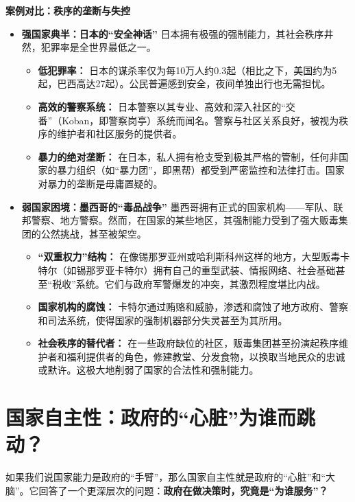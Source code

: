 \textbf{案例对比：秩序的垄断与失控}

\begin{itemize}
    \item \textbf{强国家典半：日本的“安全神话”}
    日本拥有极强的强制能力，其社会秩序井然，犯罪率是全世界最低之一。
    \begin{itemize}
        \item \textbf{低犯罪率：} 日本的谋杀率仅为每10万人约0.3起（相比之下，美国约为5起，巴西高达27起）。公民普遍感到安全，夜间单独出行也无需担忧。
        \item \textbf{高效的警察系统：} 日本警察以其专业、高效和深入社区的“交番”（Koban，即警察岗亭）系统而闻名。警察与社区关系良好，被视为秩序的维护者和社区服务的提供者。
        \item \textbf{暴力的绝对垄断：} 在日本，私人拥有枪支受到极其严格的管制，任何非国家的暴力组织（如“暴力团”，即黑帮）都受到严密监控和法律打击。国家对暴力的垄断是毋庸置疑的。
    \end{itemize}
    \item \textbf{弱国家困境：墨西哥的“毒品战争”}
    墨西哥拥有正式的国家机构——军队、联邦警察、地方警察。然而，在国家的某些地区，其强制能力受到了强大贩毒集团的公然挑战，甚至被架空。
    \begin{itemize}
        \item \textbf{“双重权力”结构：} 在像锡那罗亚州或哈利斯科州这样的地方，大型贩毒卡特尔（如锡那罗亚卡特尔）拥有自己的重型武装、情报网络、社会基础甚至“税收”系统。它们与政府军警爆发的冲突，其激烈程度堪比内战。
        \item \textbf{国家机构的腐蚀：} 卡特尔通过贿赂和威胁，渗透和腐蚀了地方政府、警察和司法系统，使得国家的强制机器部分失灵甚至为其所用。
        \item \textbf{社会秩序的替代者：} 在一些政府缺位的社区，贩毒集团甚至扮演起秩序维护者和福利提供者的角色，修建教堂、分发食物，以换取当地民众的忠诚或默许。这极大地削弱了国家的合法性和强制能力。
    \end{itemize}
\end{itemize}

\hrulefill

\section{国家自主性：政府的“心脏”为谁而跳动？}

如果我们说国家能力是政府的“手臂”，那么国家自主性就是政府的“心脏”和“大脑”。它回答了一个更深层次的问题：\textbf{政府在做决策时，究竟是“为谁服务”？}


